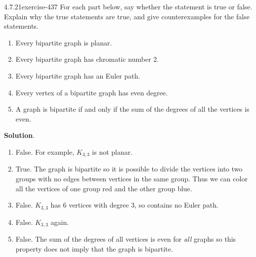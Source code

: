 \documentclass[twoside,11pt,]{book}
\numberwithin{equation}{chapter}
\begin{document}
\begin{divisionsolution}{4.7.21}{}{exercise-437}%
\hypertarget{p-5001}{}%
For each part below, say whether the statement is true or false. Explain why the true statements are true, and give counterexamples for the false statements.\leavevmode%
\begin{enumerate}[label=(\alph*)]
\item\hypertarget{li-2408}{}\hypertarget{p-5002}{}%
Every bipartite graph is planar.%
\item\hypertarget{li-2409}{}\hypertarget{p-5003}{}%
Every bipartite graph has chromatic number 2.%
\item\hypertarget{li-2410}{}\hypertarget{p-5004}{}%
Every bipartite graph has an Euler path.%
\item\hypertarget{li-2411}{}\hypertarget{p-5005}{}%
Every vertex of a bipartite graph has even degree.%
\item\hypertarget{li-2412}{}\hypertarget{p-5006}{}%
A graph is bipartite if and only if the sum of the degrees of all the vertices is even.%
\end{enumerate}
%
\par\smallskip%
\noindent\textbf{Solution}.\quad%
\hypertarget{p-5007}{}%
\leavevmode%
\begin{enumerate}[label=(\alph*)]
\item\hypertarget{li-2413}{}\hypertarget{p-5008}{}%
False. For example, \(K_{3,3}\) is not planar.%
\item\hypertarget{li-2414}{}\hypertarget{p-5009}{}%
True. The graph is bipartite so it is possible to divide the vertices into two groups with no edges between vertices in the same group. Thus we can color all the vertices of one group red and the other group blue.%
\item\hypertarget{li-2415}{}\hypertarget{p-5010}{}%
False. \(K_{3,3}\) has 6 vertices with degree 3, so contains no Euler path.%
\item\hypertarget{li-2416}{}\hypertarget{p-5011}{}%
False. \(K_{3,3}\) again.%
\item\hypertarget{li-2417}{}\hypertarget{p-5012}{}%
False. The sum of the degrees of all vertices is even for \emph{all} graphs so this property does not imply that the graph is bipartite.%
\end{enumerate}
%
\end{divisionsolution}%
\end{document}
